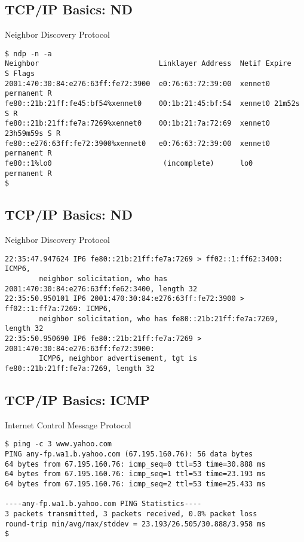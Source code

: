 \documentclass[xga]{xdvislides}
\begin{document}
\subsection{TCP/IP Basics: ND}
\begin{center}
Neighbor Discovery Protocol
\end{center}
\vspace{.2in}

\begin{verbatim}
$ ndp -n -a
Neighbor                            Linklayer Address  Netif Expire      S Flags
2001:470:30:84:e276:63ff:fe72:3900  e0:76:63:72:39:00  xennet0 permanent R
fe80::21b:21ff:fe45:bf54%xennet0    00:1b:21:45:bf:54  xennet0 21m52s    S R
fe80::21b:21ff:fe7a:7269%xennet0    00:1b:21:7a:72:69  xennet0 23h59m59s S R
fe80::e276:63ff:fe72:3900%xennet0   e0:76:63:72:39:00  xennet0 permanent R
fe80::1%lo0                          (incomplete)      lo0     permanent R
$
\end{verbatim}

\subsection{TCP/IP Basics: ND}
\begin{center}
Neighbor Discovery Protocol
\end{center}
\vspace{.2in}
\begin{verbatim}
22:35:47.947624 IP6 fe80::21b:21ff:fe7a:7269 > ff02::1:ff62:3400: ICMP6,
        neighbor solicitation, who has 2001:470:30:84:e276:63ff:fe62:3400, length 32
22:35:50.950101 IP6 2001:470:30:84:e276:63ff:fe72:3900 > ff02::1:ff7a:7269: ICMP6,
        neighbor solicitation, who has fe80::21b:21ff:fe7a:7269, length 32
22:35:50.950690 IP6 fe80::21b:21ff:fe7a:7269 > 2001:470:30:84:e276:63ff:fe72:3900:
        ICMP6, neighbor advertisement, tgt is fe80::21b:21ff:fe7a:7269, length 32
\end{verbatim}

\subsection{TCP/IP Basics: ICMP}
\begin{center}
Internet Control Message Protocol
\end{center}
\vspace{.2in}

\begin{verbatim}
$ ping -c 3 www.yahoo.com
PING any-fp.wa1.b.yahoo.com (67.195.160.76): 56 data bytes
64 bytes from 67.195.160.76: icmp_seq=0 ttl=53 time=30.888 ms
64 bytes from 67.195.160.76: icmp_seq=1 ttl=53 time=23.193 ms
64 bytes from 67.195.160.76: icmp_seq=2 ttl=53 time=25.433 ms

----any-fp.wa1.b.yahoo.com PING Statistics----
3 packets transmitted, 3 packets received, 0.0% packet loss
round-trip min/avg/max/stddev = 23.193/26.505/30.888/3.958 ms
$
\end{verbatim}
\end{document}
